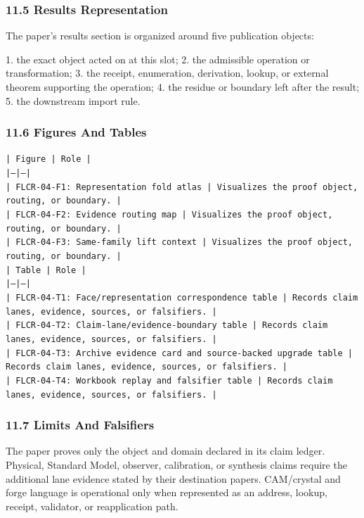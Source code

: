\documentclass[11pt]{article}
\begin{document}
\subsubsection*{11.5 Results Representation}

The paper's results section is organized around five publication objects:

1. the exact object acted on at this slot;
2. the admissible operation or transformation;
3. the receipt, enumeration, derivation, lookup, or external theorem supporting
   the operation;
4. the residue or boundary left after the result;
5. the downstream import rule.

\subsubsection*{11.6 Figures And Tables}

\noindent\texttt{| Figure | Role |}\\
\noindent\texttt{|---|---|}\\
\noindent\texttt{| FLCR-04-F1: Representation fold atlas | Visualizes the proof object, routing, or boundary. |}\\
\noindent\texttt{| FLCR-04-F2: Evidence routing map | Visualizes the proof object, routing, or boundary. |}\\
\noindent\texttt{| FLCR-04-F3: Same-family lift context | Visualizes the proof object, routing, or boundary. |}\\

\noindent\texttt{| Table | Role |}\\
\noindent\texttt{|---|---|}\\
\noindent\texttt{| FLCR-04-T1: Face/representation correspondence table | Records claim lanes, evidence, sources, or falsifiers. |}\\
\noindent\texttt{| FLCR-04-T2: Claim-lane/evidence-boundary table | Records claim lanes, evidence, sources, or falsifiers. |}\\
\noindent\texttt{| FLCR-04-T3: Archive evidence card and source-backed upgrade table | Records claim lanes, evidence, sources, or falsifiers. |}\\
\noindent\texttt{| FLCR-04-T4: Workbook replay and falsifier table | Records claim lanes, evidence, sources, or falsifiers. |}\\

\subsubsection*{11.7 Limits And Falsifiers}

The paper proves only the object and domain declared in its claim ledger.
Physical, Standard Model, observer, calibration, or synthesis claims require
the additional lane evidence stated by their destination papers. CAM/crystal
and forge language is operational only when represented as an address, lookup,
receipt, validator, or reapplication path.
\end{document}
